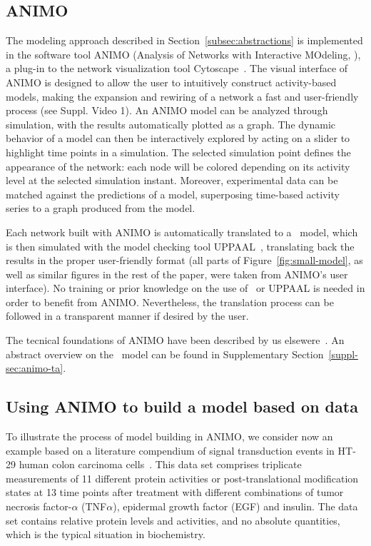 \subsection{ANIMO}
The modeling approach described in Section~\ref{subsec:abstractions} is implemented in the
software tool ANIMO (Analysis of Networks with Interactive MOdeling, \citealt{animo-bibe}),
a plug-in to the network visualization tool Cytoscape~\citep{cytoscape}. The visual interface of ANIMO
is designed to allow the user to intuitively construct activity-based models, making the expansion
and rewiring of a network a fast and user-friendly process (see Suppl. Video 1). An ANIMO model can
be analyzed through simulation, with the results automatically plotted as a graph.
The dynamic behavior of a model can then be interactively explored by
acting on a slider to highlight time points in a simulation. The selected simulation
point defines the appearance of the network: each node will be colored depending on its activity level
at the selected simulation instant. Moreover, experimental data can be matched against
the predictions of a model, superposing time-based activity series to a graph produced from the model.


Each network built with ANIMO is automatically translated to
a \tas\ model, which is then simulated with the model checking tool UPPAAL~\citep{uppaal},
translating back the results in the proper user-friendly format
(all parts of Figure~\ref{fig:small-model}, as well as similar figures
in the rest of the paper, were taken from ANIMO's user interface).
No training
or prior knowledge on the use of \tas\ or UPPAAL is needed in order to benefit from ANIMO.
Nevertheless, the translation process can be followed in a transparent manner if
desired by the user.

The tecnical foundations of ANIMO have been described by us elsewere~\citep{animo-bibe}. 
An abstract overview on the \tas\ model can be found in Supplementary Section~\ref{suppl-sec:animo-ta}.


\subsection{Using ANIMO to build a model based on data}\label{subsec:case-study}
To illustrate the process of model building in ANIMO, we consider now an example based on a literature compendium of
signal transduction events in HT-29 human colon carcinoma cells~\citep{pathway-compendium}. This data set comprises triplicate
measurements of 11 different protein activities or post-translational modification states at 13 time points after
treatment with different combinations of tumor necrosis factor-$\alpha$ (TNF$\alpha$), epidermal growth factor (EGF) and insulin.
The data set contains relative protein levels and activities, and no absolute quantities, which is the typical situation in biochemistry.

